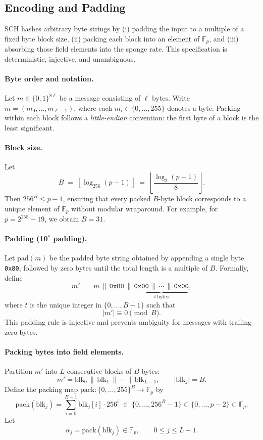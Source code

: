 ﻿\documentclass[english]{aucmcs}
\newcommand{\Fp}{\mathbb{F}_p}
\begin{document}
\subsection{Encoding and Padding}
\label{sec:spec-encoding}

SCH hashes arbitrary byte strings by (i) padding the input to a multiple of a
fixed byte block size, (ii) packing each block into an element of $\Fp$, and
(iii) absorbing those field elements into the sponge rate.
This specification is deterministic, injective, and unambiguous.

\paragraph{Byte order and notation.}
Let $m \in \{0,1\}^{8\ell}$ be a message consisting of $\ell$ bytes.
Write $m = (m_0,\ldots,m_{\ell-1})$, where each $m_i \in \{0,\ldots,255\}$ denotes
a byte.
Packing within each block follows a \emph{little-endian} convention: the first
byte of a block is the least significant.

\paragraph{Block size.}
Let
\[
B \;=\; \left\lfloor \log_{256}(p-1)\right\rfloor
\;=\; \left\lfloor \frac{\log_2(p-1)}{8}\right\rfloor .
\]
Then $256^B \le p-1$, ensuring that every packed $B$-byte block corresponds to a
unique element of $\Fp$ without modular wraparound.
For example, for $p = 2^{255}-19$, we obtain $B = 31$.

\paragraph{Padding (10\texorpdfstring{$^\ast$}{*} padding).}
Let $\mathrm{pad}(m)$ be the padded byte string obtained by appending a single
byte \texttt{0x80}, followed by zero bytes until the total length is a multiple
of $B$.
Formally, define
\[
m' \;=\; m \,\|\, \texttt{0x80} \,\|\, 
\underbrace{\texttt{0x00}\,\|\,\cdots\,\|\,\texttt{0x00}}_{t\ \text{bytes}},
\]
where $t$ is the unique integer in $\{0,\ldots,B-1\}$ such that
\[
\lvert m' \rvert \equiv 0 \pmod{B}.
\]
This padding rule is injective and prevents ambiguity for messages with trailing
zero bytes.

\paragraph{Packing bytes into field elements.}
Partition $m'$ into $L$ consecutive blocks of $B$ bytes:
\[
m' = \mathrm{blk}_0 \,\|\, \mathrm{blk}_1 \,\|\, \cdots \,\|\, \mathrm{blk}_{L-1},
\qquad \lvert \mathrm{blk}_j \rvert = B.
\]
Define the packing map $\mathrm{pack}:\{0,\ldots,255\}^B \to \Fp$ by
\[
\mathrm{pack}(\mathrm{blk}_j)
= \sum_{i=0}^{B-1} \mathrm{blk}_j[i] \cdot 256^i
\;\in\; \{0,\ldots,256^B-1\}
\subset \{0,\ldots,p-2\}
\subset \Fp .
\]
Let
\[
\alpha_j = \mathrm{pack}(\mathrm{blk}_j) \in \Fp,
\qquad 0 \le j \le L-1.
\]
\end{document}

